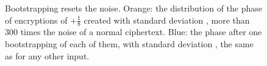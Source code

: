 \begin{figure}[!htb]
\centering

\caption{Bootstrapping resets the noise. Orange: the distribution of the phase
of encryptions of $+\frac18$ created with standard deviation \BootSdIn, more
than $300$ times the noise of a normal ciphertext. Blue: the phase after one
bootstrapping of each of them, with standard deviation \BootSdOut, the same as
for any other input.}
\label{fig:noisereset}
\end{figure}
